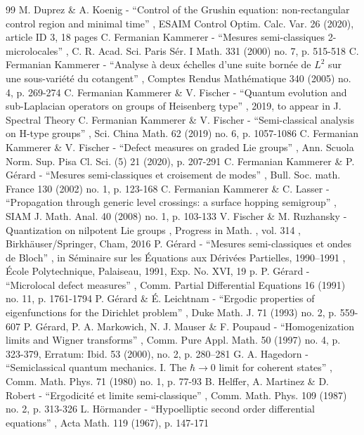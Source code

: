 \documentclass[10pt]{amsart}
\theoremstyle{plain}
\theoremstyle{definition}
\begin{document}
\begin{thebibliography}{99}
 M. Duprez \& A. Koenig - “Control of the Grushin equation: non-rectangular control region and minimal time” , ESAIM Control Optim. Calc. Var. 26 (2020), article ID 3, 18 pages
 C. Fermanian Kammerer - “Mesures semi-classiques 2-microlocales” , C. R. Acad. Sci. Paris Sér. I Math. 331 (2000) no. 7, p. 515-518
 C. Fermanian Kammerer - “Analyse à deux échelles d’une suite bornée de $L^2$ sur une sous-variété du cotangent” , Comptes Rendus Mathématique 340 (2005) no. 4, p. 269-274
 C. Fermanian Kammerer \& V. Fischer - “Quantum evolution and sub-Laplacian operators on groups of Heisenberg type” , 2019, to appear in J. Spectral Theory
 C. Fermanian Kammerer \& V. Fischer - “Semi-classical analysis on H-type groups” , Sci. China Math. 62 (2019) no. 6, p. 1057-1086
 C. Fermanian Kammerer \& V. Fischer - “Defect measures on graded Lie groups” , Ann. Scuola Norm. Sup. Pisa Cl. Sci. (5) 21 (2020), p. 207-291
 C. Fermanian Kammerer \& P. Gérard - “Mesures semi-classiques et croisement de modes” , Bull. Soc. math. France 130 (2002) no. 1, p. 123-168
 C. Fermanian Kammerer \& C. Lasser - “Propagation through generic level crossings: a surface hopping semigroup” , SIAM J. Math. Anal. 40 (2008) no. 1, p. 103-133
 V. Fischer \& M. Ruzhansky - Quantization on nilpotent Lie groups , Progress in Math. , vol. 314 , Birkhäuser/Springer, Cham, 2016
 P. Gérard - “Mesures semi-classiques et ondes de Bloch” , in Séminaire sur les Équations aux Dérivées Partielles, 1990–1991 , École Polytechnique, Palaiseau, 1991, Exp. No. XVI, 19 p.
 P. Gérard - “Microlocal defect measures” , Comm. Partial Differential Equations 16 (1991) no. 11, p. 1761-1794
 P. Gérard \& É. Leichtnam - “Ergodic properties of eigenfunctions for the Dirichlet problem” , Duke Math. J. 71 (1993) no. 2, p. 559-607
 P. Gérard, P. A. Markowich, N. J. Mauser \& F. Poupaud - “Homogenization limits and Wigner transforms” , Comm. Pure Appl. Math. 50 (1997) no. 4, p. 323-379, Erratum: Ibid. 53 (2000), no. 2, p. 280–281
 G. A. Hagedorn - “Semiclassical quantum mechanics. I. The $\hbar \rightarrow 0$ limit for coherent states” , Comm. Math. Phys. 71 (1980) no. 1, p. 77-93
 B. Helffer, A. Martinez \& D. Robert - “Ergodicité et limite semi-classique” , Comm. Math. Phys. 109 (1987) no. 2, p. 313-326
 L. Hörmander - “Hypoelliptic second order differential equations” , Acta Math. 119 (1967), p. 147-171

\end{thebibliography}
\end{document}
